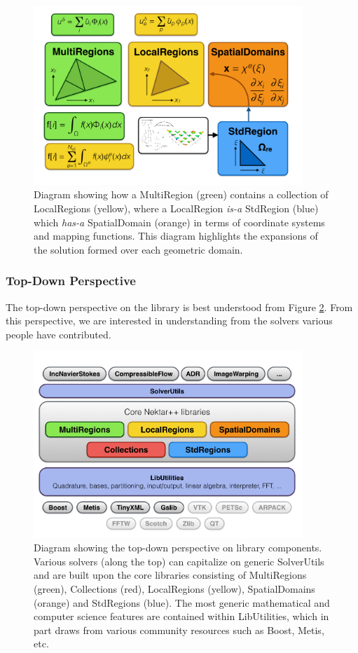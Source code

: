 \begin{figure}[htb]
\centering
\includegraphics[width=4in]{img/structure1.png}
\caption{Diagram showing how a MultiRegion (green) contains a collection of LocalRegions (yellow), where a LocalRegion {\em is-a} StdRegion (blue) which {\em has-a} SpatialDomain (orange) in terms of coordinate systems and mapping functions.  This diagram highlights the expansions of the solution formed over each geometric domain.}
\label{intro:structure1}
\end{figure}


\subsubsection{Top-Down Perspective}

The top-down perspective on the library is best understood from Figure \ref{intro:structure2}.  From this perspective, we are interested in understanding 
{\nek} from the solvers various people have contributed.  

\begin{figure}[htb]
\centering
\includegraphics[width=4in]{img/structure2.png}
\caption{Diagram showing the top-down perspective on library components.  Various solvers (along the top) can capitalize on generic SolverUtils and are built upon
the core {\nek} libraries consisting of MultiRegions (green), Collections (red), LocalRegions (yellow), SpatialDomains (orange) and StdRegions (blue).  The most 
generic mathematical and computer science features are contained within LibUtilities, which in part draws from various community resources such as Boost, Metis, etc.}
\label{intro:structure2}
\end{figure}


